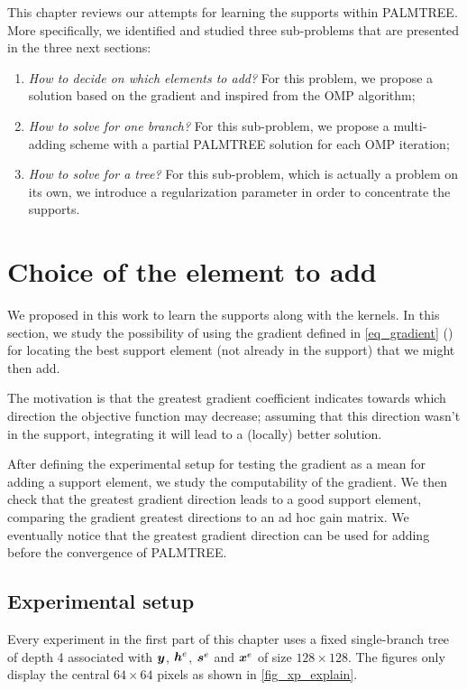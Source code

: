 \noindent
This chapter reviews our attempts for learning the supports within PALMTREE. More specifically, we identified and studied three sub-problems that are presented in the three next sections: 
\begin{enumerate}[label=--,noitemsep,nolistsep]
	\item \emph{How to decide on which elements to add?} For this problem, we propose a solution based on the gradient and inspired from the \acs{OMP} algorithm;
	\item \emph{How to solve for one branch?} For this sub-problem, we propose a multi-adding scheme with a partial PALMTREE solution for each \acs{OMP} iteration;
	\item \emph{How to solve for a tree?} For this sub-problem, which is actually a problem on its own, we introduce a regularization parameter in order to concentrate the supports.
\end{enumerate}


\section{Choice of the element to add}

We proposed in this work to learn the supports along with the kernels. In this section, we study the possibility of using the gradient defined in \cref{eq_gradient} () for locating the best support element (not already in the support) that we might then add. 

\noindent
The motivation is that the greatest gradient coefficient indicates towards which direction the objective function may decrease; assuming that this direction wasn't in the support, integrating it will lead to a (locally) better solution.

\noindent 
After defining the experimental setup for testing the gradient as a mean for adding a support element, we study the computability of the gradient. We then check that the greatest gradient direction leads to a good support element, comparing the gradient greatest directions to an ad hoc gain matrix. We eventually notice that the greatest gradient direction can be used for adding before the convergence of PALMTREE.

\subsection{Experimental setup}
Every experiment in the first part of this chapter uses a fixed single-branch tree of depth 4 associated with $\bm{y}$, $\bm{h}^e$, $\bm{s}^e$ and $\bm{x}^e$ of size $128 \times 128$. The figures only display the central $64 \times 64$ pixels as shown in \cref{fig_xp_explain}.

